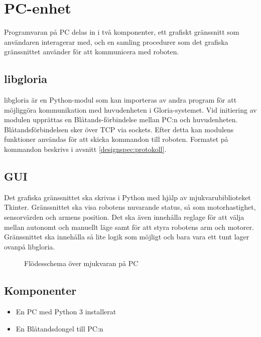 \section{PC-enhet}
Programvaran på PC delas in i två komponenter, ett grafiskt gränssnitt som användaren interagerar med, och en samling procedurer som det grafiska gränssnittet använder för att kommunicera med roboten. 

\subsection{libgloria}
libgloria är en Python-modul som kan importeras av andra program för att möjliggöra kommunikation med huvudenheten i Gloria-systemet. Vid initiering av modulen upprättas en Blåtands-förbindelse mellan PC:n och huvudenheten. Blåtandsförbindelsen sker över TCP via sockets. Efter detta kan modulens funktioner användas för att skicka kommandon till roboten. Formatet på kommandon beskrivs i avsnitt \ref{designspec:protokoll}.

\subsection{GUI}
Det grafiska gränssnittet ska skrivas i Python med hjälp av mjukvarubiblioteket Tkinter. Gränssnittet ska visa robotens nuvarande status, så som motorhastighet, sensorvärden och armens position. Det ska även innehålla reglage för att välja mellan autonomt och manuellt läge samt för att styra robotens arm och motorer. Gränssnittet ska innehålla så lite logik som möjligt och bara vara ett tunt lager ovanpå libgloria.

\begin{figure}[h]
  \centerline{\scalebox{0.8}{}}
  \caption{Flödesschema över mjukvaran på PC}
\end{figure}

\subsection{Komponenter}
\begin{itemize}
\item En PC med Python 3 installerat
\item En Blåtandsdongel till PC:n
\end{itemize}
